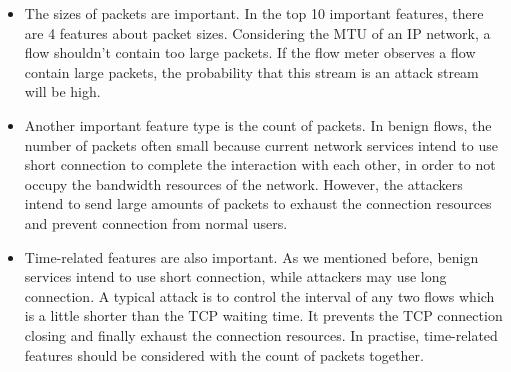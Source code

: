 \documentclass{ieeeaccess}
\theoremstyle{definition}
\begin{document}
\begin{itemize}
	\item The sizes of packets are important. In the top 10 important features, there are 4 features about packet sizes. Considering the MTU of an IP network, a flow shouldn’t contain too large packets. If the flow meter observes a flow contain large packets, the probability that this stream is an attack stream will be high.
    \item Another important feature type is the count of packets. In benign flows, the number of packets often small because current network services intend to use short connection to complete the interaction with each other, in order to not occupy the bandwidth resources of the network. However, the attackers intend to send large amounts of packets to exhaust the connection resources and prevent connection from normal users.
    \item Time-related features are also important. As we mentioned before, benign services intend to use short connection, while attackers may use long connection. A typical attack is to control the interval of any two flows which is a little shorter than the TCP waiting time. It prevents the TCP connection closing and finally exhaust the connection resources. In practise, time-related features should be considered with the count of packets together.
\end{itemize}
\end{document}
